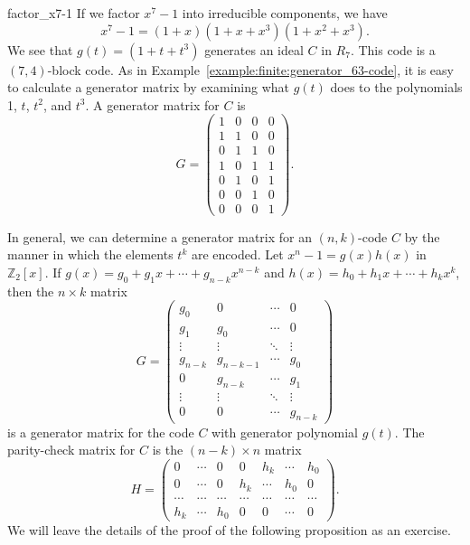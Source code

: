 \begin{example}{factor_x7-1}
If we factor $x^7 - 1$ into irreducible components, we have
\[
x^7 - 1 = (1 + x)(1 + x + x^3)(1+ x^2 + x^3).
\]
We see that $g(t) = (1 + t + t^3)$ generates an ideal $C$ in $R_7$.  This code is a $(7, 4)$-block code.  As in Example~\ref{example:finite:generator_63-code}, it is easy to calculate a generator matrix by examining what $g(t)$ does to the polynomials 1, $t$, $t^2$, and $t^3$.  A generator matrix for $C$ is 
\[
G =
\begin{pmatrix}
1 & 0 & 0 & 0 \\
1 & 1 & 0 & 0 \\
0 & 1 & 1 & 0 \\
1 & 0 & 1 & 1 \\
0 & 1 & 0 & 1 \\
0 & 0 & 1 & 0 \\
0 & 0 & 0 & 1
\end{pmatrix}.
\]
\end{example}

 
In general, we can determine a generator matrix for an $(n, k)$-code $C$ by the manner in which the elements $t^k$ are encoded. Let $x^n - 1 = g(x) h(x)$ in ${\mathbb Z}_2[x]$. If $g(x) = g_0 + g_1 x + \cdots + g_{n-k} x^{n-k}$ and $h(x) = h_0 + h_1 x +  \cdots + h_k x^k$, then the $n \times k$ matrix
\[
G = 
\begin{pmatrix}
g_0 & 0   & \cdots & 0 \\
g_1 & g_0 & \cdots & 0 \\
\vdots & \vdots &\ddots & \vdots \\
g_{n-k}   & g_{n-k-1} & \cdots & g_0 \\
0   & g_{n-k} & \cdots & g_{1} \\
\vdots & \vdots & \ddots & \vdots \\
0   & 0 & \cdots & g_{n-k}
\end{pmatrix}
\]
is a generator matrix for the code $C$ with generator polynomial $g(t)$.  The parity-check matrix for $C$ is the $(n-k) \times n$ matrix 
\[
H =
\begin{pmatrix}
0   & \cdots & 0   & 0      & h_k    & \cdots & h_0 \\
0   & \cdots & 0 & h_k & \cdots & h_0    & 0 \\
\cdots  & \cdots & \cdots  & \cdots &  \cdots &  \cdots & \cdots \\
h_k & \cdots & h_0 & 0      & 0      & \cdots & 0 
\end{pmatrix}.
\]
We will leave the details of the proof of the following proposition as an exercise.  

